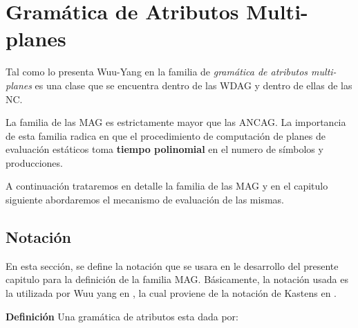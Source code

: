 \chapter{Gramática de Atributos Multi-planes}
\label{chap:mag}
\minitoc

Tal como lo presenta Wuu-Yang en \cite{wuu-yang1} la familia de \textit{gramática de atributos multi-planes} es una clase que se encuentra dentro de las WDAG y dentro de ellas de las NC.

La familia de las MAG es estrictamente mayor que las ANCAG. La importancia de esta familia radica en que el procedimiento de computación de planes de evaluación estáticos toma \textbf{tiempo polinomial} en el numero de símbolos y producciones.

A continuación trataremos en detalle la familia de las MAG y en el capitulo siguiente abordaremos el mecanismo de evaluación de las mismas.


\section{Notación}
En esta sección, se define la notación que se usara en le desarrollo del presente capitulo para la definición de la familia MAG.
Básicamente, la notación usada es la utilizada por Wuu yang en \cite{wuu-yang1}, la cual proviene de la notación de Kastens en \cite{kastens}.

\textbf{Definición} Una gramática de atributos esta dada por:

